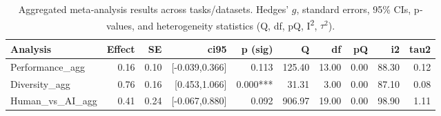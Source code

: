 \begin{table}[ht]
\centering
\begin{tabular}{lrrrrrrrrr}
  \toprule
Analysis & Effect & SE & ci95 & p (sig) & Q & df & pQ & i2 & tau2 \\ 
  \midrule
Performance_agg & 0.16 & 0.10 & [-0.039,0.366] & 0.113 & 125.40 & 13.00 & 0.00 & 88.30 & 0.12 \\ 
  Diversity_agg & 0.76 & 0.16 & [0.453,1.066] & 0.000*** & 31.31 & 3.00 & 0.00 & 87.10 & 0.08 \\ 
  Human_vs_AI_agg & 0.41 & 0.24 & [-0.067,0.880] & 0.092 & 906.97 & 19.00 & 0.00 & 98.90 & 1.11 \\ 
   \bottomrule
\end{tabular}
\caption{Aggregated meta‐analysis results across tasks/datasets. Hedges’ $g$, standard errors, 95\% CIs, p‐values, and heterogeneity statistics (Q, df, pQ, I\textsuperscript{2}, $\tau^2$).} 
\label{tab:meta_agg}
\end{table}
